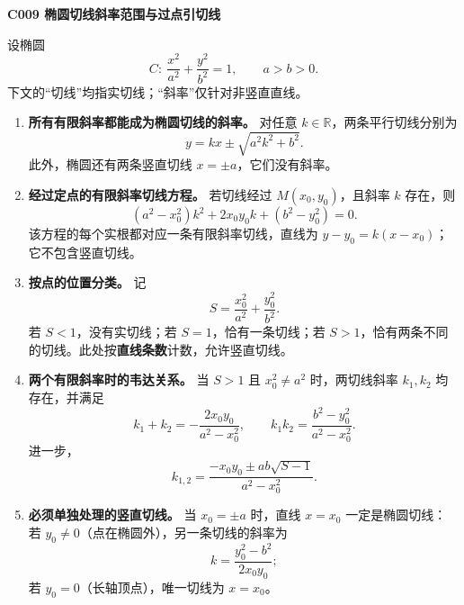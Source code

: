 \begin{statementbox}
\textbf{C009 椭圆切线斜率范围与过点引切线}

设椭圆
\[
C:\ \frac{x^2}{a^2}+\frac{y^2}{b^2}=1,\qquad a>b>0.
\]
下文的“切线”均指实切线；“斜率”仅针对非竖直直线。

\begin{enumerate}
\item \textbf{所有有限斜率都能成为椭圆切线的斜率。}
对任意 $k\in\mathbb R$，两条平行切线分别为
\[
\boxed{y=kx\pm\sqrt{a^2k^2+b^2}}.
\]
此外，椭圆还有两条竖直切线 $x=\pm a$，它们没有斜率。

\item \textbf{经过定点的有限斜率切线方程。}
若切线经过 $M(x_0,y_0)$，且斜率 $k$ 存在，则
\[
\boxed{(a^2-x_0^2)k^2+2x_0y_0k+(b^2-y_0^2)=0.}\tag{C009-1}
\]
该方程的每个实根都对应一条有限斜率切线，直线为
$y-y_0=k(x-x_0)$；它不包含竖直切线。

\item \textbf{按点的位置分类。} 记
\[
S=\frac{x_0^2}{a^2}+\frac{y_0^2}{b^2}.
\]
若 $S<1$，没有实切线；若 $S=1$，恰有一条切线；若 $S>1$，恰有两条不同的切线。此处按\textbf{直线条数}计数，允许竖直切线。

\item \textbf{两个有限斜率时的韦达关系。}
当 $S>1$ 且 $x_0^2\ne a^2$ 时，两切线斜率 $k_1,k_2$ 均存在，并满足
\[
\boxed{k_1+k_2=-\frac{2x_0y_0}{a^2-x_0^2},\qquad
k_1k_2=\frac{b^2-y_0^2}{a^2-x_0^2}.}\tag{C009-2}
\]
进一步，
\[
\boxed{k_{1,2}=\frac{-x_0y_0\pm ab\sqrt{S-1}}{a^2-x_0^2}.}\tag{C009-3}
\]

\item \textbf{必须单独处理的竖直切线。}
当 $x_0=\pm a$ 时，直线 $x=x_0$ 一定是椭圆切线：
若 $y_0\ne0$（点在椭圆外），另一条切线的斜率为
\[
\boxed{k=\frac{y_0^2-b^2}{2x_0y_0}};
\]
若 $y_0=0$（长轴顶点），唯一切线为 $x=x_0$。
\end{enumerate}
\end{statementbox}
